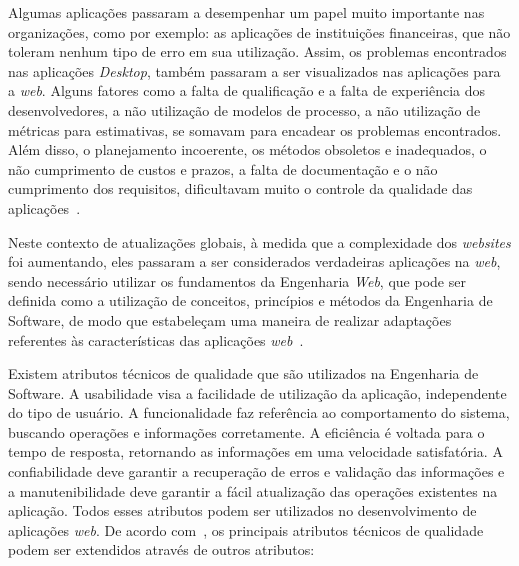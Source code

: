 Algumas aplicações passaram a desempenhar um papel muito importante nas organizações, como por exemplo: as aplicações de instituições financeiras, que não toleram nenhum tipo de erro em sua utilização. Assim, os problemas encontrados nas aplicações \textit{Desktop}, também passaram a ser visualizados nas aplicações para a \textit{web}. Alguns fatores como a falta de qualificação e a falta de experiência dos desenvolvedores, a não utilização de modelos de processo, a não utilização de métricas para estimativas, se somavam para encadear os problemas encontrados. Além disso, o planejamento incoerente, os métodos obsoletos e inadequados, o não cumprimento de custos e prazos, a falta de documentação e o não cumprimento dos requisitos, dificultavam muito o controle da qualidade das aplicações~\cite{peruch-pg07}.               

Neste contexto de atualizações globais, à medida que a complexidade dos \textit{websites} foi aumentando, eles passaram a ser considerados verdadeiras aplicações na \textit{web}, sendo necessário utilizar os fundamentos da Engenharia \textit{Web}, que pode ser definida como a utilização de conceitos, princípios e métodos da Engenharia de Software, de modo que estabeleçam uma maneira de realizar adaptações referentes às características das aplicações \textit{web}~\cite{beder:ew12}.

Existem atributos técnicos de qualidade que são utilizados na Engenharia de Software. A usabilidade visa a facilidade de utilização da aplicação, independente do tipo de usuário. A funcionalidade faz referência ao comportamento do sistema, buscando operações e informações corretamente. A eficiência é voltada para o tempo de resposta, retornando as informações em uma velocidade satisfatória. A confiabilidade deve garantir a recuperação de erros e validação das informações e a manutenibilidade deve garantir a fácil atualização das operações existentes na aplicação. Todos esses atributos podem ser utilizados no desenvolvimento de aplicações \textit{web}. De acordo com~, os principais atributos técnicos de qualidade podem ser extendidos através de outros atributos: 

